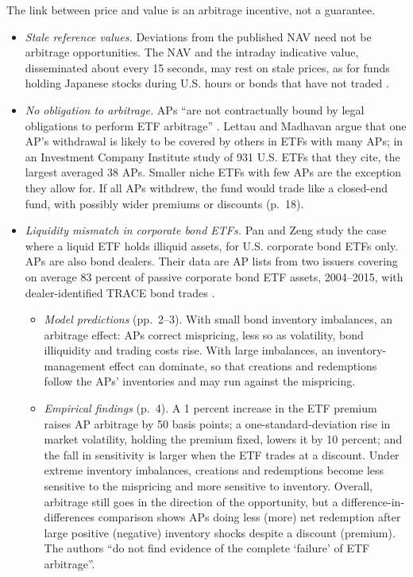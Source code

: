 \begin{qfmechanism}
 The link between price and value is an arbitrage incentive, not a guarantee.
\begin{itemize}
\item \emph{Stale reference values.} Deviations from the published NAV need not be arbitrage opportunities. The NAV and the intraday indicative value, disseminated about every 15 seconds, may rest on stale prices, as for funds holding Japanese stocks during U.S. hours or bonds that have not traded \citep[p.~6]{ex-lettau-madhavan-2018}.
\item \emph{No obligation to arbitrage.} APs ``are not contractually bound by legal obligations to perform ETF arbitrage'' \citep[ESRB version, p.~1]{wide-pan-zeng-etf}. Lettau and Madhavan argue that one AP's withdrawal is likely to be covered by others in ETFs with many APs; in an Investment Company Institute study of 931 U.S. ETFs that they cite, the largest averaged 38 APs. Smaller niche ETFs with few APs are the exception they allow for. If all APs withdrew, the fund would trade like a closed-end fund, with possibly wider premiums or discounts (p.~18).
\item \emph{Liquidity mismatch in corporate bond ETFs.} Pan and Zeng study the case where a liquid ETF holds illiquid assets, for U.S. corporate bond ETFs only. APs are also bond dealers. Their data are AP lists from two issuers covering on average 83 percent of passive corporate bond ETF assets, 2004--2015, with dealer-identified TRACE bond trades \citep[abstract and pp.~1--3]{wide-pan-zeng-etf}.
\begin{itemize}
\item \emph{Model predictions} (pp.~2--3). With small bond inventory imbalances, an arbitrage effect: APs correct mispricing, less so as volatility, bond illiquidity and trading costs rise. With large imbalances, an inventory-management effect can dominate, so that creations and redemptions follow the APs' inventories and may run against the mispricing.
\item \emph{Empirical findings} (p.~4). A 1 percent increase in the ETF premium raises AP arbitrage by 50 basis points; a one-standard-deviation rise in market volatility, holding the premium fixed, lowers it by 10 percent; and the fall in sensitivity is larger when the ETF trades at a discount. Under extreme inventory imbalances, creations and redemptions become less sensitive to the mispricing and more sensitive to inventory. Overall, arbitrage still goes in the direction of the opportunity, but a difference-in-differences comparison shows APs doing less (more) net redemption after large positive (negative) inventory shocks despite a discount (premium). The authors ``do not find evidence of the complete `failure' of ETF arbitrage''.

\end{itemize}
\end{itemize}
\end{qfmechanism}
